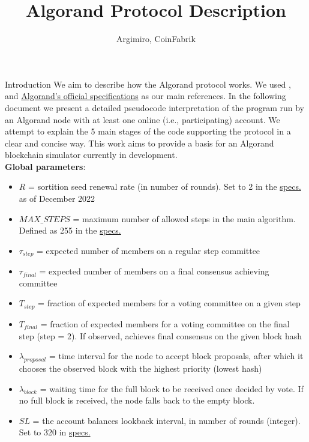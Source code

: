 \documentclass[10pt,a4paper]{article}
\author{Argimiro, CoinFabrik}
\title{Algorand Protocol Description}
\begin{document}
\maketitle
\tableofcontents

\begin{section}{Introduction}
We aim to describe how the Algorand protocol works. We used \cite{DBLP:conf/sosp/GiladHMVZ17},
\cite{DBLP:journals/corr/Micali16} and \href{https://github.com/algorandfoundation/specs}{Algorand's official specifications}
as our main references.
In the following document we present a detailed pseudocode interpretation 
of the program run by an Algorand node with at least one online (i.e., participating) account.
We attempt to explain the 5 main stages of the code supporting 
the protocol in a clear and concise way.
This work aims to provide a basis for an Algorand blockchain simulator 
currently in development. \\

\noindent \textbf{Global parameters}:
\begin{itemize}
    \item $R$ = sortition seed renewal rate (in number of rounds). Set to 2 in the \href{https://github.com/algorandfoundation/specs}{specs.}
    as of December 2022
    \item $MAX\_STEPS$ = maximum number of allowed steps in the main algorithm. Defined 
    as 255 in the \href{https://github.com/algorandfoundation/specs}{specs.}
    \item $\tau_{step}$ = expected number of members on a regular step committee
    \item $\tau_{final}$ = expected number of members on a final consensus achieving committee
    \item $T_{step}$ = fraction of expected members for a voting committee on a given step
    \item $T_{final}$ = fraction of expected members for a voting committee on the final step (step = 2). If observed,
    achieves final consensus on the given block hash
    \item $\lambda_{proposal}$ = time interval for the node to accept block proposals, after
    which it chooses the observed block with the highest priority (lowest hash) 
    \item $\lambda_{block}$ = waiting time for the full block to be received once decided by vote.
    If no full block is received, the node falls back to the empty block.
    \item $SL$ = the account balances lookback interval, in number of rounds (integer). Set to 320 in \href{https://github.com/algorandfoundation/specs}{specs.}
  \end{itemize}


\end{section}
\end{document}
